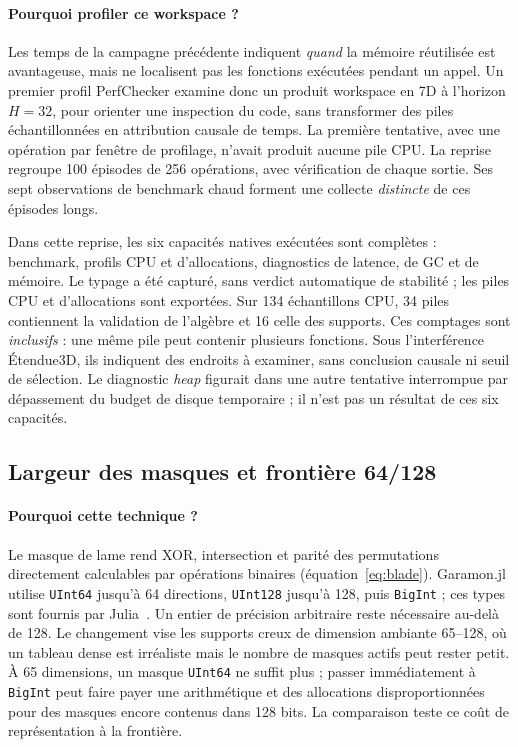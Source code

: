 \documentclass[11pt,a4paper]{article}
\newcommand{\code}[1]{\texttt{#1}}
\begin{document}
\paragraph{Pourquoi profiler ce workspace ?}
Les temps de la campagne précédente indiquent \emph{quand} la mémoire
réutilisée est avantageuse, mais ne localisent pas les fonctions exécutées
pendant un appel. Un premier profil PerfChecker examine donc un produit
workspace en 7D à l'horizon $H=32$, pour orienter une inspection du code,
sans transformer des piles échantillonnées en attribution causale de temps.
La première tentative, avec une opération par fenêtre de profilage, n'avait
produit aucune pile CPU. La reprise regroupe 100 épisodes de 256 opérations,
avec vérification de chaque sortie. Ses sept observations de benchmark chaud
forment une collecte \emph{distincte} de ces épisodes longs.

Dans cette reprise, les six capacités natives exécutées sont complètes :
benchmark, profils CPU et d'allocations, diagnostics de latence, de GC et de
mémoire. Le typage a été capturé, sans verdict automatique de stabilité ;
les piles CPU et d'allocations sont exportées. Sur 134 échantillons CPU,
34 piles contiennent la validation de l'algèbre et 16 celle des supports.
Ces comptages sont \emph{inclusifs} : une même pile peut contenir plusieurs
fonctions. Sous l'interférence Étendue3D, ils indiquent des endroits à
examiner, sans conclusion causale ni seuil de sélection. Le diagnostic
\emph{heap} figurait dans une autre tentative interrompue par dépassement
du budget de disque temporaire ; il n'est pas un résultat de ces six
capacités.
\FloatBarrier

\subsection{Largeur des masques et frontière 64/128}
\paragraph{Pourquoi cette technique ?}
Le masque de lame rend XOR, intersection et parité des permutations
directement calculables par opérations binaires
(équation~\eqref{eq:blade}). Garamon.jl utilise \code{UInt64} jusqu'à 64
directions, \code{UInt128} jusqu'à 128, puis \code{BigInt} ; ces types
sont fournis par Julia~\cite{julianumbers}. Un entier de
précision arbitraire reste nécessaire au-delà de 128. Le changement vise les
supports creux de dimension ambiante 65--128, où un tableau dense est
irréaliste mais le nombre de masques actifs peut rester petit.
À 65 dimensions, un masque \code{UInt64} ne suffit plus ; passer
immédiatement à \code{BigInt} peut faire payer une arithmétique et des
allocations disproportionnées pour des masques encore contenus dans
128 bits. La comparaison teste ce coût de représentation à la frontière.
\end{document}
